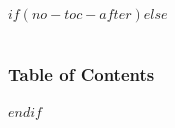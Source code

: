 $if(no-toc-after)$$else$
    \section[]{}
\begin{frame}
\small
\frametitle{Table of Contents}
\tableofcontents
\end{frame}
$endif$